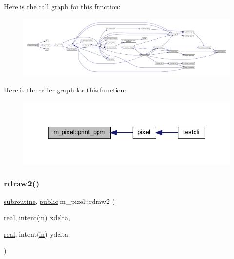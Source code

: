Here is the call graph for this function\+:
\nopagebreak
\begin{figure}[H]
\begin{center}
\leavevmode
\includegraphics[width=350pt]{namespacem__pixel_a01797b04ce7c693c3fd6a841e8d1de48_cgraph}
\end{center}
\end{figure}
Here is the caller graph for this function\+:
\nopagebreak
\begin{figure}[H]
\begin{center}
\leavevmode
\includegraphics[width=331pt]{namespacem__pixel_a01797b04ce7c693c3fd6a841e8d1de48_icgraph}
\end{center}
\end{figure}
\mbox{\label{namespacem__pixel_a664375b036092dbebe1bccdc67254e1d}} 
\subsubsection{\texorpdfstring{rdraw2()}{rdraw2()}}
{\footnotesize\ttfamily \hyperlink{M__stopwatch_83_8txt_acfbcff50169d691ff02d4a123ed70482}{subroutine}, \hyperlink{M__stopwatch_83_8txt_a2f74811300c361e53b430611a7d1769f}{public} m\+\_\+pixel\+::rdraw2 (\begin{DoxyParamCaption}\item[{\hyperlink{read__watch_83_8txt_abdb62bde002f38ef75f810d3a905a823}{real}, intent(\hyperlink{M__journal_83_8txt_afce72651d1eed785a2132bee863b2f38}{in})}]{xdelta,  }\item[{\hyperlink{read__watch_83_8txt_abdb62bde002f38ef75f810d3a905a823}{real}, intent(\hyperlink{M__journal_83_8txt_afce72651d1eed785a2132bee863b2f38}{in})}]{ydelta }\end{DoxyParamCaption})}




